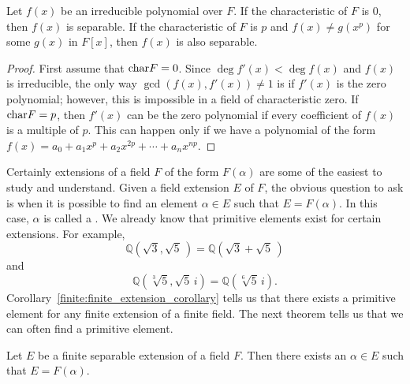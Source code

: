 \begin{proposition}
Let $f(x)$ be an irreducible polynomial over $F$. If the
characteristic of $F$ is $0$, then $f(x)$ is separable.  If the
characteristic of $F$ is $p$ and $f(x) \neq g(x^p)$ for some $g(x)$
in $F[x]$, then $f(x)$ is also separable.
\end{proposition}
 
 
\begin{proof}
First assume that ${\rm char } F = 0$. Since $\deg f'(x) < \deg f(x)$ 
and $f(x)$ is irreducible, the only way $\gcd( f(x), f'(x)) \neq 1$ is
if $f'(x)$ is the zero polynomial; however, this is impossible in
a field of characteristic zero. If ${\rm char } F = p$, then $f'(x)$
can be the zero polynomial if every coefficient of $f(x)$ is a
multiple of $p$.  This can happen only if we have a polynomial of the
form $f(x) = a_0 + a_1 x^p + a_2 x^{2p} + \cdots + a_n x^{np}$. 
\end{proof}
 
 
\medskip
 
 
Certainly extensions of a field $F$ of the form $F(\alpha)$ are some
of the easiest to study and understand.  Given a field extension $E$
of $F$, the obvious question to ask is when it is possible to find an
element $\alpha \in E$ such that $E = F( \alpha )$. In this case,
$\alpha$ is called a . We already
know that primitive elements exist for certain extensions. For example,
\[
{\mathbb Q}( \sqrt{3}, \sqrt{5}\, ) = {\mathbb Q}( \sqrt{3} + \sqrt{5}\, )
\]
and
\[
{\mathbb Q}( \sqrt[3]{5}, \sqrt{5}\, i ) = {\mathbb Q}( \sqrt[6]{5}\, i ).
\]
Corollary~\ref{finite:finite_extension_corollary} tells us that there exists a primitive element for any 
finite extension of a finite field. The next theorem tells us that we 
can often find a primitive element.
 
 
\begin{theorem}\label{galois:primitive_element_theorem}
Let $E$ be a finite separable extension of a field $F$. Then there
exists an $\alpha \in E$ such that $E=F( \alpha )$. 
\end{theorem}
 
